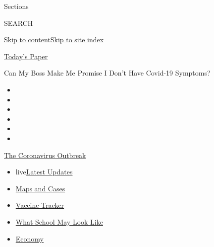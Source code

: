 Sections

SEARCH

\protect\hyperlink{site-content}{Skip to
content}\protect\hyperlink{site-index}{Skip to site index}

\href{https://myaccount.nytimes3xbfgragh.onion/auth/login?response_type=cookie\&client_id=vi}{}

\href{https://www.nytimes3xbfgragh.onion/section/todayspaper}{Today's
Paper}

Can My Boss Make Me Promise I Don't Have Covid-19 Symptoms?

\begin{itemize}
\item
\item
\item
\item
\item
\item
\end{itemize}

\href{https://www.nytimes3xbfgragh.onion/news-event/coronavirus?action=click\&pgtype=Article\&state=default\&region=TOP_BANNER\&context=storylines_menu}{The
Coronavirus Outbreak}

\begin{itemize}
\tightlist
\item
  live\href{https://www.nytimes3xbfgragh.onion/2020/08/01/world/coronavirus-covid-19.html?action=click\&pgtype=Article\&state=default\&region=TOP_BANNER\&context=storylines_menu}{Latest
  Updates}
\item
  \href{https://www.nytimes3xbfgragh.onion/interactive/2020/us/coronavirus-us-cases.html?action=click\&pgtype=Article\&state=default\&region=TOP_BANNER\&context=storylines_menu}{Maps
  and Cases}
\item
  \href{https://www.nytimes3xbfgragh.onion/interactive/2020/science/coronavirus-vaccine-tracker.html?action=click\&pgtype=Article\&state=default\&region=TOP_BANNER\&context=storylines_menu}{Vaccine
  Tracker}
\item
  \href{https://www.nytimes3xbfgragh.onion/interactive/2020/07/29/us/schools-reopening-coronavirus.html?action=click\&pgtype=Article\&state=default\&region=TOP_BANNER\&context=storylines_menu}{What
  School May Look Like}
\item
  \href{https://www.nytimes3xbfgragh.onion/live/2020/07/31/business/stock-market-today-coronavirus?action=click\&pgtype=Article\&state=default\&region=TOP_BANNER\&context=storylines_menu}{Economy}
\end{itemize}

